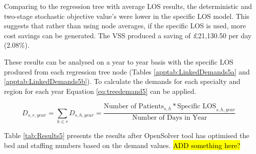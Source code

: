 \documentclass[../thesis.tex]{subfiles}
\begin{document}
Comparing to the regression tree with average LOS results, the deterministic and two-stage stochastic objective value's were lower in the specific LOS model. This suggests that rather than using node averages, if the specific LOS is used, more cost savings can be generated. The VSS produced a saving of $\pounds$21,130.50 per day (2.08\%). 

These results can be analysed on a year to year basis with the specific LOS produced from each regression tree node (Tables \ref{apptab:LinkedDemands5a} and \ref{apptab:LinkedDemands5b}). To calculate the demands for each specialty and region for each year Equation \eqref{eq:treedemand5} can be applied.


\begin{equation}\label{eq:treedemand5}
        D_{s,r,year} = \sum\limits_{h \in r} D_{s,h,year} = \frac{\text{Number of Patients}_{s,h}*{\text{Specific LOS}_{s,h,year}}}{{\text{Number of Days in Year}}}
\end{equation}

Table \ref{tab:Results5} presents the results after OpenSolver tool has optimised the bed and staffing numbers based on the demand values. \hl{ADD something here?} 
\end{document}
